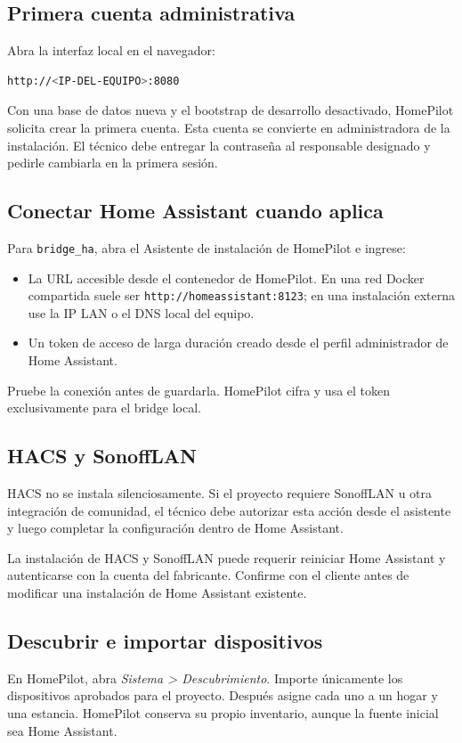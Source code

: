 \subsection{Primera cuenta administrativa}
Abra la interfaz local en el navegador:
\begin{lstlisting}[language=bash]
http://<IP-DEL-EQUIPO>:8080
\end{lstlisting}

Con una base de datos nueva y el bootstrap de desarrollo desactivado, HomePilot solicita crear la primera cuenta. Esta cuenta se convierte en administradora de la instalación. El técnico debe entregar la contraseña al responsable designado y pedirle cambiarla en la primera sesión.

\subsection{Conectar Home Assistant cuando aplica}
Para \texttt{bridge\_ha}, abra el Asistente de instalación de HomePilot e ingrese:
\begin{itemize}[itemsep=0.15cm]
    \item La URL accesible desde el contenedor de HomePilot. En una red Docker compartida suele ser \texttt{http://homeassistant:8123}; en una instalación externa use la IP LAN o el DNS local del equipo.
    \item Un token de acceso de larga duración creado desde el perfil administrador de Home Assistant.
\end{itemize}

Pruebe la conexión antes de guardarla. HomePilot cifra y usa el token exclusivamente para el bridge local.

\subsection{HACS y SonoffLAN}
HACS no se instala silenciosamente. Si el proyecto requiere SonoffLAN u otra integración de comunidad, el técnico debe autorizar esta acción desde el asistente y luego completar la configuración dentro de Home Assistant.

\begin{tcolorbox}[title=Importante]
La instalación de HACS y SonoffLAN puede requerir reiniciar Home Assistant y autenticarse con la cuenta del fabricante. Confirme con el cliente antes de modificar una instalación de Home Assistant existente.
\end{tcolorbox}

\subsection{Descubrir e importar dispositivos}
En HomePilot, abra \textit{Sistema > Descubrimiento}. Importe únicamente los dispositivos aprobados para el proyecto. Después asigne cada uno a un hogar y una estancia. HomePilot conserva su propio inventario, aunque la fuente inicial sea Home Assistant.
